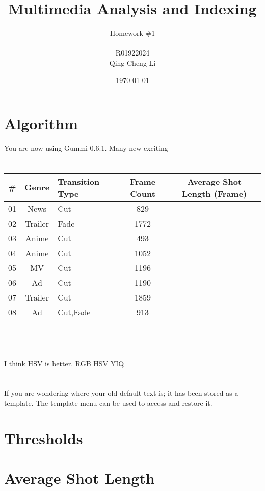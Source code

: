 \documentclass[11pt]{article}
\title{\textbf{Multimedia Analysis and Indexing}}
\author{Homework \#1\\
		\\
		R01922024\\
		Qing-Cheng Li}
\date{\today}
\begin{document}
\maketitle

\section{Algorithm}

You are now using Gummi 0.6.1. Many new exciting 

\section{}

\begin{tabular}{c|c|l|c||c}
	\# & Genre & Transition Type & Frame Count & Average Shot Length (Frame)\\
\hline
\hline
	01 & News & Cut & 829 & \\
\hline
	02 & Trailer & Fade & 1772 & \\
\hline
	03 & Anime & Cut & 493 & \\
\hline
	04 & Anime & Cut & 1052 & \\
\hline
	05 & MV & Cut & 1196 & \\
\hline
	06 & Ad & Cut & 1190 & \\
\hline
	07 & Trailer & Cut & 1859 & \\
\hline
	08 & Ad & Cut,Fade & 913 & \\
\end{tabular}
\\
\\
\\
I think HSV is better. 
RGB
HSV
YIQ

\section{}
If you are wondering where your old default text is; it has been stored as a template. The template menu can be used to access and restore it. 

\section{Thresholds}

\section{Average Shot Length}

\section{}
\end{document}
